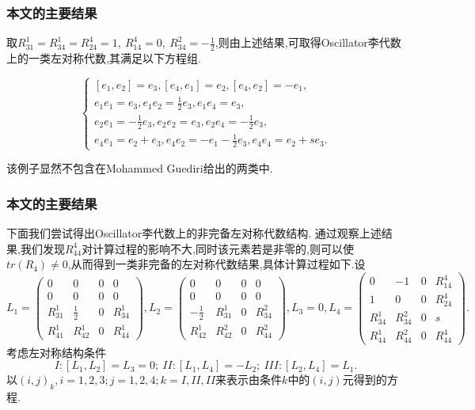 \documentclass[aspectratio=169, 10pt, utf8, mathserif]{beamer}
\begin{document}
\begin{frame}[plain]
	\frametitle{本文的主要结果}
	\begin{Example}
		取$R_{31}^1=R_{34}^1=R_{24}^4=1,\ R_{14}^4=0,\ R_{34}^2=-\frac{1}{2}$,则由上述结果,可取得Oscillator李代数上的一类左对称代数,其满足以下方程组.
		
		\begin{equation*}\left\{
		\begin{array}{l}
		[e_1,e_2]=e_3,[e_4,e_1]=e_2,[e_4,e_2]=-e_1,\\
		e_1e_1=e_3,e_1e_2=\frac{1}{2}e_3,e_1e_4=e_3,\\
		e_2e_1=-\frac{1}{2}e_3,e_2e_2=e_3,e_2e_4=-\frac{1}{2}e_3,\\
		e_4e_1=e_2+e_3,e_4e_2=-e_1-\frac{1}{2}e_3,e_4e_4=e_2+se_3.
		\end{array}
		\right.
		\end{equation*}

该例子显然不包含在Mohammed Guediri给出的两类中.
	
	\end{Example}
\end{frame}

\begin{frame}
	\frametitle{本文的主要结果}
	下面我们尝试得出Oscillator李代数上的非完备左对称代数结构.
	通过观察上述结果,我们发现$R_{44}^4$对计算过程的影响不大,同时该元素若是非零的,则可以使$tr(R_4)\neq 0$,从而得到一类非完备的左对称代数结果,具体计算过程如下.设
	$$L_1=\left(\begin{smallmatrix}
	0 & 0 & 0 & 0 \\
	0 & 0 & 0 & 0 \\
	R_{31}^{1} & \frac{1}{2} & 0 & R_{34}^{1} \\
	R_{41}^{1} & R_{42}^{1} & 0 & R_{44}^{1}
	\end{smallmatrix}\right),
	L_2=\left(\begin{smallmatrix}
	0 & 0 & 0 & 0 \\
	0 & 0 & 0 & 0 \\
	-\frac{1}{2} & R_{31}^{1} & 0 & R_{34}^{2} \\
	R_{42}^{1} & R_{42}^{2} & 0 & R_{44}^{2}
	\end{smallmatrix}\right), L_3=0, L_4=\left(\begin{smallmatrix}
	0 & -1 & 0 & R_{14}^{4} \\
	1 & 0 & 0 & R_{24}^{4} \\
	R_{34}^{1} & R_{34}^{2} & 0 & s \\
	R_{44}^{1} & R_{44}^{2} & 0 & R_{44}^{4}
	\end{smallmatrix}\right).$$
	考虑左对称结构条件
	\[I:[L_1,L_2]=L_3=0;\ II:[L_1,L_4]=-L_2;\ III:[L_2,L_4]=L_1.\]
	以$(i,j)_k,i=1,2,3;j=1,2,4;k=I,II,II$来表示由条件$k$中的$(i,j)$元得到的方程.
\end{frame}
\end{document}
